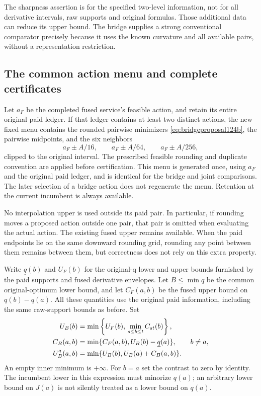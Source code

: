 The sharpness assertion is for the specified two-level information,
not for all derivative intervals, raw supports and original formulas.
Those additional data can reduce its upper bound. The bridge supplies
a strong conventional comparator precisely because it uses the known
curvature and all available pairs, without a representation restriction.

\subsection{The common action menu and complete certificates}

Let $a_F$ be the completed fused service's feasible action, and retain
its entire original paid ledger. If that ledger contains at least two
distinct actions, the new fixed menu contains the rounded pairwise
minimizers \eqref{eq:bridgeproposal124b}, the pairwise midpoints, and
the six neighbors
\[
 a_F\pm A/16,\qquad a_F\pm A/64,\qquad a_F\pm A/256,
\]
clipped to the original interval. The prescribed feasible rounding
and duplicate convention are applied before certification. This menu
is generated once, using $a_F$ and the original paid ledger, and is
identical for the bridge and joint comparisons. The later selection
of a bridge action does not regenerate the menu. Retention at the
current incumbent is always available.

No interpolation upper is used outside its paid pair. In particular,
if rounding moves a proposed action outside one pair, that pair is
omitted when evaluating the actual action. The existing fused upper
remains available. When the paid endpoints lie on the same downward
rounding grid, rounding any point between them remains between them,
but correctness does not rely on this extra property.

Write $\underline q(b)$ and $U_F(b)$ for the original-q lower and
upper bounds furnished by the paid supports and fused derivative
envelopes. Let $B\le\min q$ be the common original-optimum lower
bound, and let $C_F(a,b)$ be the fused upper bound on $q(b)-q(a)$.
All these quantities use the original paid information, including
the same raw-support bounds as before. Set
\begin{align}
 U_B(b)&=\min\left\{U_F(b),\,
                  \min_{s\le b\le t} C_{st}(b)\right\},\notag\\
 C_B(a,b)&=\min\{C_F(a,b),U_B(b)-\underline q(a)\},
                      \qquad b\ne a ,\notag\\
 U_B^q(a,b)&=\min\{U_B(b),U_B(a)+C_B(a,b)\}.
 \label{eq:bridgecertificate124b}
\end{align}
An empty inner minimum is $+\infty$. For $b=a$ set the contrast
to zero by identity. The incumbent lower in this expression must
minorize $q(a)$; an arbitrary lower bound on $J(a)$ is not silently
treated as a lower bound on $q(a)$.

